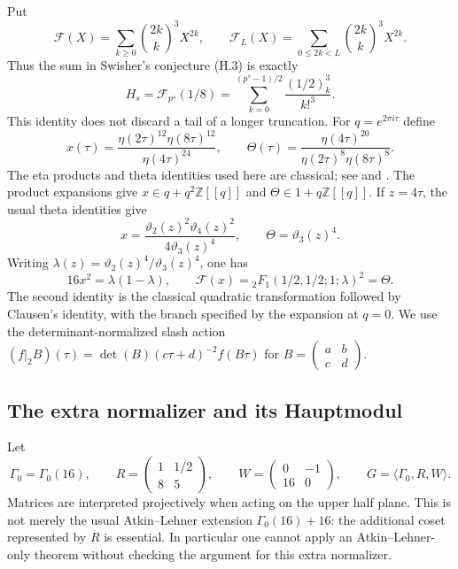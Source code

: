 \documentclass[11pt,a4paper]{article}
\begin{document}
Put
\[
 \mathcal F(X)=\sum_{k\geq0}\binom{2k}{k}^{3}X^{2k},\qquad
 \mathcal F_L(X)=\sum_{0\leq 2k<L}\binom{2k}{k}^{3}X^{2k}.
\]
Thus the sum in Swisher's conjecture (H.3) is exactly
\[
 H_s=\mathcal F_{p^s}(1/8)
     =\sum_{k=0}^{(p^s-1)/2}\frac{(1/2)_k^3}{k!^3}.
\]
This identity does not discard a tail of a longer truncation.
For $q=e^{2\pi i\tau}$ define
\[
 x(\tau)=\frac{\eta(2\tau)^{12}\eta(8\tau)^{12}}
                   {\eta(4\tau)^{24}},\qquad
 \Theta(\tau)=\frac{\eta(4\tau)^{20}}
                   {\eta(2\tau)^8\eta(8\tau)^8}.
\]
The eta products and theta identities used here are classical; see
\cite[Appendix~C, Section~9.1]{Beukers} and \cite[Section~20.7]{DLMF}.
The product expansions give $x\in q+q^2\mathbb Z[[q]]$ and
$\Theta\in1+q\mathbb Z[[q]]$.  If $z=4\tau$, the usual theta identities give
\begin{equation}\label{raw:theta}
 x=\frac{\vartheta_2(z)^2\vartheta_4(z)^2}
             {4\vartheta_3(z)^4},\qquad
 \Theta=\vartheta_3(z)^4.
\end{equation}
Writing $\lambda(z)=\vartheta_2(z)^4/\vartheta_3(z)^4$, one has
\begin{equation}\label{raw:lambda}
 16x^2=\lambda(1-\lambda),\qquad
 \mathcal F(x)=
 {}_2F_1(1/2,1/2;1;\lambda)^2=\Theta.
\end{equation}
The second identity is the classical quadratic transformation followed by
Clausen's identity, with the branch specified by the expansion at $q=0$.
We use the determinant-normalized slash action
$(f|_2B)(\tau)=\det(B)(c\tau+d)^{-2}f(B\tau)$
for $B=\left(\begin{smallmatrix}a&b\\c&d\end{smallmatrix}\right)$.

\subsection{The extra normalizer and its Hauptmodul}

Let
\[
 \Gamma_0=\Gamma_0(16),\qquad
 R=\begin{pmatrix}1&1/2\\8&5\end{pmatrix},\qquad
 W=\begin{pmatrix}0&-1\\16&0\end{pmatrix},\qquad
 G=\langle\Gamma_0,R,W\rangle.
\]
Matrices are interpreted projectively when acting on the upper half plane.
This is not merely the usual Atkin--Lehner extension
$\Gamma_0(16)+16$: the additional coset represented by $R$ is essential.
In particular one cannot apply an Atkin--Lehner-only theorem without checking
the argument for this extra normalizer.
\end{document}
